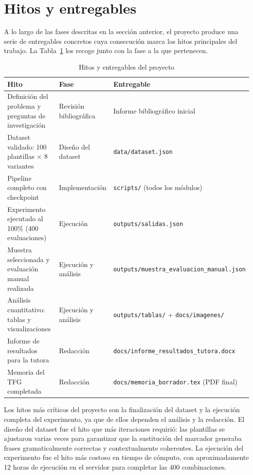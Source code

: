 \documentclass[12pt]{report} %
\renewcommand{\_}{\oldunderscore\allowbreak}
\begin{document}
\section{Hitos y entregables}
A lo largo de las fases descritas en la sección anterior, el proyecto produce una serie de entregables concretos cuya consecución marca los hitos principales del trabajo. La Tabla~\ref{tab:hitos} los recoge junto con la fase a la que pertenecen.

\begin{table}[H]
\centering
\footnotesize
\begin{tabular}{p{5cm}p{2.8cm}p{5.2cm}}
\hline
\textbf{Hito} & \textbf{Fase} & \textbf{Entregable} \\
\hline
Definición del problema y preguntas de investigación & Revisión bibliográfica & Informe bibliográfico inicial \\
\hline
Dataset validado: 100 plantillas × 8 variantes & Diseño del dataset & \nolinkurl{data/dataset.json} \\
\hline
Pipeline completo con checkpoint & Implementación & \nolinkurl{scripts/} (todos los módulos) \\
\hline
Experimento ejecutado al 100\% (400 evaluaciones) & Ejecución & \nolinkurl{outputs/salidas.json} \\
\hline
Muestra seleccionada y evaluación manual realizada & Ejecución y análisis & \nolinkurl{outputs/muestra_evaluacion_manual.json} \\
\hline
Análisis cuantitativo: tablas y visualizaciones & Ejecución y análisis & \nolinkurl{outputs/tablas/} + \nolinkurl{docs/imagenes/} \\
\hline
Informe de resultados para la tutora & Redacción & \nolinkurl{docs/informe_resultados_tutora.docx} \\
\hline
Memoria del TFG completada & Redacción & \nolinkurl{docs/memoria_borrador.tex} (PDF final) \\
\hline
\end{tabular}
\caption{Hitos y entregables del proyecto}
\label{tab:hitos}
\end{table}

Los hitos más críticos del proyecto son la finalización del dataset y la ejecución completa del experimento, ya que de ellos dependen el análisis y la redacción. El diseño del dataset fue el hito que más iteraciones requirió: las plantillas se ajustaron varias veces para garantizar que la sustitución del marcador generaba frases gramaticalmente correctas y contextualmente coherentes. La ejecución del experimento fue el hito más costoso en tiempo de cómputo, con aproximadamente 12 horas de ejecución en el servidor para completar las 400 combinaciones.
\end{document}
